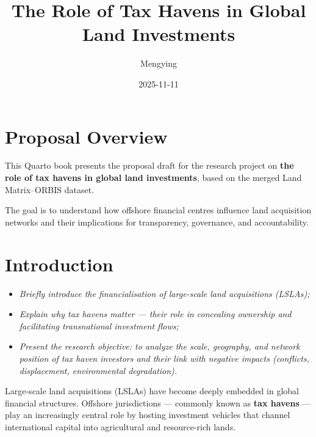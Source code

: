 \documentclass[
  letterpaper,
  DIV=11,
  numbers=noendperiod]{scrreprt}
\title{The Role of Tax Havens in Global Land Investments}
\author{Mengying}
\date{2025-11-11}
\providecommand{\tightlist}{%
  \setlength{\itemsep}{0pt}\setlength{\parskip}{0pt}}
\renewcommand*\contentsname{Table of contents}
\newcommand\contentsname{Table of contents}
\begin{document}
\maketitle

\renewcommand*\contentsname{Table of contents}
{
\hypersetup{linkcolor=}
\setcounter{tocdepth}{2}
\tableofcontents
}


\chapter*{Proposal Overview}\label{proposal-overview}


This Quarto book presents the proposal draft for the research project on
\textbf{the role of tax havens in global land investments}, based on the
merged Land Matrix--ORBIS dataset.

The goal is to understand how offshore financial centres influence land
acquisition networks and their implications for transparency,
governance, and accountability.


\chapter{Introduction}\label{introduction}

\begin{itemize}
\tightlist
\item
  \emph{Briefly introduce the financialisation of large-scale land
  acquisitions (LSLAs);}
\item
  \emph{Explain why tax havens matter --- their role in concealing
  ownership and facilitating transnational investment flows;}
\item
  \emph{Present the research objective: to analyze the scale, geography,
  and network position of tax haven investors and their link with
  negative impacts (conflicts, displacement, environmental
  degradation).}
\end{itemize}

Large-scale land acquisitions (LSLAs) have become deeply embedded in
global financial structures. Offshore jurisdictions --- commonly known
as \textbf{tax havens} --- play an increasingly central role by hosting
investment vehicles that channel international capital into agricultural
and resource-rich lands.
\end{document}
